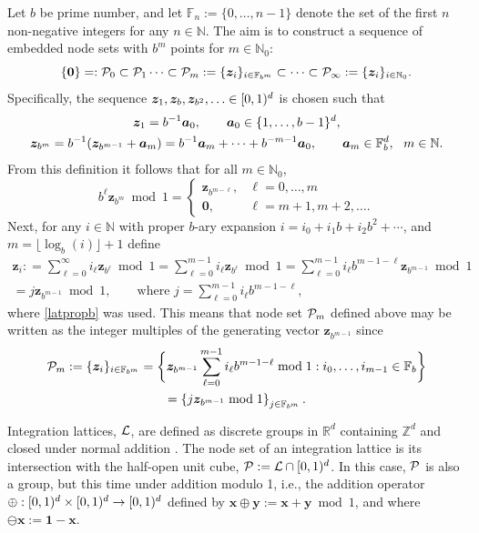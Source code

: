 \documentclass[graybox]{svmult}
\newcommand{\Z}{\mathbb{Z}} %
\newcommand{\R}{\mathbb{R}} %
\newcommand{\N}{\mathbb{N}} %
\newcommand{\F}{\mathbb{F}} %
\newcommand{\bszero}{\boldsymbol{0}} %
\newcommand{\bsone}{\boldsymbol{1}}  %
\newcommand{\bsx}{\boldsymbol{x}}    %
\newcommand{\bsy}{\boldsymbol{y}}    %
\newcommand{\bsz}{\boldsymbol{z}}    %
\begin{document}
Let $b$ be prime number, and let $\F_{n}:=\{0, \ldots, n-1\}$ denote the set of the first $n$ non-negative integers for any $n \in \N$. The aim is to construct a sequence of embedded node sets with $b^m$ points for $m \in \N_0$:
\[
\{\bszero\}=:\cp_0\subset \cp_1 \dots\subset\cp_m:=\{\bsz_i\}_{i\in \F_{b^m}} \subset\dots\subset\cp_\infty:=\{\bsz_i\}_{i\in \N_0}.
\]
Specifically, the sequence $\bsz_1, \bsz_b, \bsz_{b^2},  \ldots \in \cube$ is chosen such that 
\begin{subequations} \label{zbmdef}
\begin{gather} 
\bsz_1 = b^{-1} \bsa_0, \qquad \bsa_0 \in \{1, \ldots, b-1\}^{d}, \\
\bsz_{b^m} = b^{-1}(\bsz_{b^{m-1}}+\bsa_m)= b^{-1}\bsa_m + \cdots + b^{-m-1} \bsa_0, \qquad \bsa_m \in \F_b^{d}, \ \ m \in \N.
\end{gather}
\end{subequations}
From this definition it follows that for all $m \in \N_0$,
\begin{equation} 
b^\ell\bsz_{b^m} \bmod {1} = \begin{cases} \bsz_{b^{m-\ell}}, & \ell=0, \ldots, m \\
\bszero, & \ell=m+1, m+2, \ldots .
\end{cases}
\label{latpropb}
\end{equation}
Next, for any $i \in \N$ with proper $b$-ary expansion $i=i_0+i_1 b + i_2 b^2 + \cdots$, and $m=\lfloor \log_b(i) \rfloor+1$ define 
\begin{multline} \label{zidef}
\bsz_i : = \sum_{\ell=0}^{\infty} i_\ell \bsz_{b^\ell} \bmod 1 = \sum_{\ell=0}^{m-1} i_\ell \bsz_{b^\ell} \bmod 1 = \sum_{\ell=0}^{m-1} i_\ell b^{m-1-\ell}  \bsz_{b^{m-1}} \bmod 1 \\ 
 = j \bsz_{b^{m-1}} \bmod 1, \qquad \text{where } j= \sum_{\ell=0}^{m-1} i_\ell b^{m-1-\ell},
\end{multline}
where \eqref{latpropb} was used.  This means that node set $\mathcal{P}_m$ defined above may be written as the integer multiples of the generating vector $\bsz_{b^{m-1}}$ since 
\begin{multline*}
\cp_m:= \{\bsz_i\}_{i \in \F_{b^m}} = \bigg \{ \bsz_{b^{m-1}} \sum_{\ell=0}^{m-1} i_\ell b^{m-1-\ell} \bmod 1 : i_0, \ldots , i_{m-1} \in \F_b \bigg \} \\
= \left\{ j \bsz_{b^{m-1}} \bmod 1\right \}_{j \in \F_{b^m} }.
\end{multline*}

Integration lattices, $\mathcal{L}$, are defined as discrete groups in $\R^d$ containing $\Z^d$ and closed under normal addition \cite[Sec. 2.7-2.8]{SloJoe94}.  The node set of an integration lattice is its intersection with the half-open unit cube, $\mathcal{P}:=\mathcal{L} \cap [0,1)^d$. In this case, $\mathcal{P}$ is also a group, but this time under addition modulo 1, i.e., the addition operator $\oplus:[0,1)^d \times [0,1)^d \to [0,1)^d$ defined by $\bsx\oplus\bsy:=\bsx+\bsy\bmod 1$, and where $\ominus \bsx:=\bsone-\bsx$.
\end{document}
